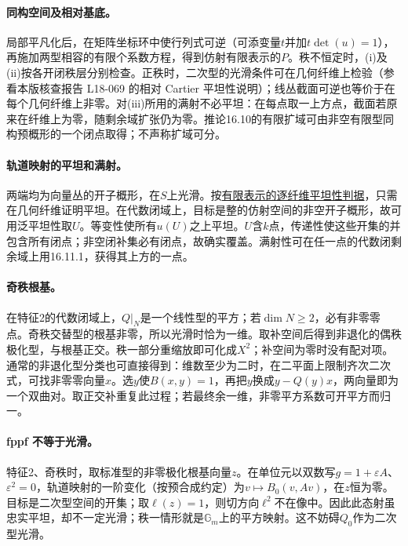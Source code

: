 \documentclass[UTF8,a4paper]{ctexbook}
\begin{document}
\paragraph{同构空间及相对基底。}
局部平凡化后，在矩阵坐标环中使行列式可逆（可添变量$t$并加$t\det(u)=1$），再施加两型相容的有限个系数方程，得到仿射有限表示的$P$。秩不恒定时，(i)及(ii)按各开闭秩层分别检查。正秩时，二次型的光滑条件可在几何纤维上检验（参看本版核查报告 L18-069 的相对 Cartier 平坦性说明）；线丛截面可逆也等价于在每个几何纤维上非零。对(iii)所用的满射不必平坦：在每点取一上方点，截面若原来在纤维上为零，随剩余域扩张仍为零。推论16.10的有限扩域可由非空有限型同构预概形的一个闭点取得；不声称扩域可分。

\paragraph{轨道映射的平坦和满射。}
两端均为向量丛的开子概形，在$S$上光滑。按\href{https://stacks.math.columbia.edu/tag/039C}{有限表示的逐纤维平坦性判据}，只需在几何纤维证明平坦。在代数闭域上，目标是整的仿射空间的非空开子概形，故可用泛平坦性取$U$。等变性使所有$u(U)$之上平坦。$U$含$k$点，传递性使这些开集的并包含所有闭点；非空闭补集必有闭点，故确实覆盖。满射性可在任一点的代数闭剩余域上用16.11.1，获得其上方的一点。

\paragraph{奇秩根基。}
在特征2的代数闭域上，$Q|_N$是一个线性型的平方；若$\dim N\ge2$，必有非零零点。奇秩交替型的根基非零，所以光滑时恰为一维。取补空间后得到非退化的偶秩极化型，与根基正交。秩一部分重缩放即可化成$X^2$；补空间为零时没有配对项。通常的非退化型分类也可直接得到：维数至少为二时，在二平面上限制齐次二次式，可找非零零向量$x$。选$y$使$B(x,y)=1$，再把$y$换成$y-Q(y)x$，两向量即为一个双曲对。取正交补重复此过程；若最终余一维，非零平方系数可开平方而归一。

\paragraph{fppf 不等于光滑。}
特征2、奇秩时，取标准型的非零极化根基向量$z$。在单位元以双数写$g=1+\varepsilon A$、$\varepsilon^2=0$，轨道映射的一阶变化（按预合成约定）为$v\mapsto B_0(v,Av)$，在$z$恒为零。目标是二次型空间的开集；取$\ell(z)=1$，则切方向$\ell^2$不在像中。因此此态射虽忠实平坦，却不一定光滑；秩一情形就是$\mathbb G_m$上的平方映射。这不妨碍$Q_0$作为二次型光滑。
\par\endgroup
\end{document}
